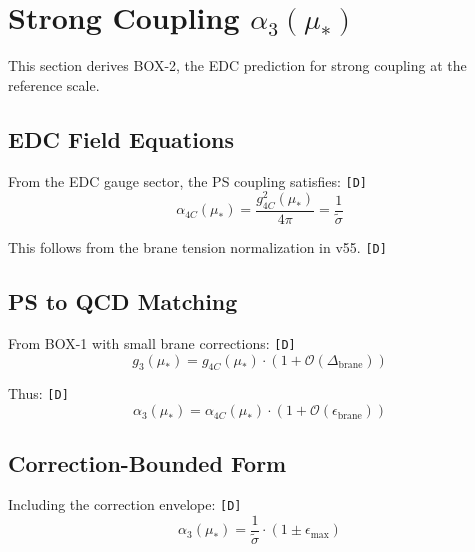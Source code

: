 \documentclass[11pt,a4paper]{article}
\newcommand{\tagD}{\textcolor{green!50!black}{\texttt{[D]}}}
\theoremstyle{definition}
\begin{document}
\section{Strong Coupling $\alpha_3(\mu_*)$}
\label{sec:alpha3}

This section derives BOX-2, the EDC prediction for strong coupling at the reference scale.

\subsection{EDC Field Equations}
\label{subsec:edc-field-eqs}

From the EDC gauge sector, the PS coupling satisfies: \tagD{}
\begin{equation}
\label{eq:ps-coupling-edc}
\alpha_{4C}(\mu_*) = \frac{g_{4C}^2(\mu_*)}{4\pi} = \frac{1}{\tilde{\sigma}}
\end{equation}

This follows from the brane tension normalization in v55. \tagD{}

\subsection{PS to QCD Matching}
\label{subsec:ps-qcd-matching}

From BOX-1 with small brane corrections: \tagD{}
\begin{equation}
\label{eq:ps-qcd-match}
g_3(\mu_*) = g_{4C}(\mu_*) \cdot (1 + \mathcal{O}(\Delta_{\text{brane}}))
\end{equation}

Thus: \tagD{}
\begin{equation}
\label{eq:alpha3-from-ps}
\alpha_3(\mu_*) = \alpha_{4C}(\mu_*) \cdot (1 + \mathcal{O}(\epsilon_{\text{brane}}))
\end{equation}

\subsection{Correction-Bounded Form}
\label{subsec:correction-bounded}

Including the correction envelope: \tagD{}
\begin{equation}
\label{eq:alpha3-bounded-form}
\alpha_3(\mu_*) = \frac{1}{\tilde{\sigma}} \cdot (1 \pm \epsilon_{\max})
\end{equation}
\end{document}
